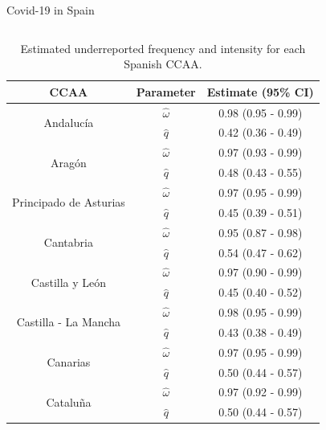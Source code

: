 \documentclass[
    10pt,
    aspectratio=169,
    usenames,
    dvipsnames
]{beamer}
\begin{document}
\begin{frame}{Covid-19 in Spain}
  \begin{columns}
    \begin{column}{0.5\textwidth}
        \begin{table}\tiny
    \caption{Estimated underreported frequency and intensity for each Spanish CCAA.}
\begin{tabular}{ccc}
\toprule
CCAA & Parameter & Estimate (95\% CI)\\
\midrule
\multirow{2}{*}{Andaluc\'ia}  & $\hat{\omega}$  & 0.98 (0.95 - 0.99) \\
                              & $\hat{q}$       & 0.42 (0.36 - 0.49) \\
\midrule
\multirow{2}{*}{Arag\'on}    & $\hat{\omega}$  & 0.97 (0.93 - 0.99) \\
                             & $\hat{q}$       & 0.48 (0.43 - 0.55) \\
\midrule
\multirow{2}{*}{Principado de Asturias}    & $\hat{\omega}$  & 0.97 (0.95 - 0.99) \\
                                           & $\hat{q}$       & 0.45 (0.39 - 0.51) \\
\midrule
\multirow{2}{*}{Cantabria}    & $\hat{\omega}$  & 0.95 (0.87 - 0.98) \\
                              & $\hat{q}$       & 0.54 (0.47 - 0.62) \\
\midrule
\multirow{2}{*}{Castilla y Le\'on}    & $\hat{\omega}$  & 0.97 (0.90 - 0.99) \\
                                      & $\hat{q}$       & 0.45 (0.40 - 0.52) \\
\midrule
\multirow{2}{*}{Castilla - La Mancha}    & $\hat{\omega}$  & 0.98 (0.95 - 0.99) \\
                                         & $\hat{q}$       & 0.43 (0.38 - 0.49) \\
\midrule
\multirow{2}{*}{Canarias}    & $\hat{\omega}$  & 0.97 (0.95 - 0.99) \\
                             & $\hat{q}$       & 0.50 (0.44 - 0.57) \\
\midrule
\multirow{2}{*}{Catalu\~na}    & $\hat{\omega}$  & 0.97 (0.92 - 0.99) \\
                               & $\hat{q}$       & 0.50 (0.44 - 0.57) \\
\bottomrule
\end{tabular}
\end{table}
    \end{column}

\end{columns}
\end{frame}
\end{document}
